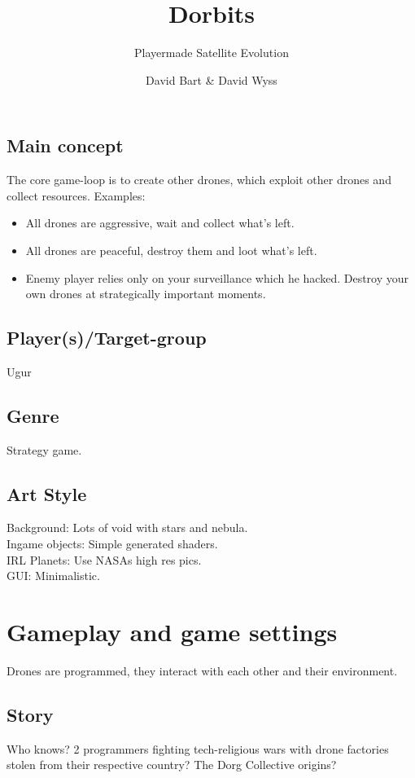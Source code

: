 \documentclass[a4paper]{scrreprt}
\title{Dorbits}
\subtitle{Playermade Satellite Evolution}
\author{David Bart & David Wyss}
\begin{document}
\maketitle

\tableofcontents

\section{Main concept}
The core game-loop is to create other drones, which exploit other drones and collect resources. 
Examples:
\begin{itemize}
	\item All drones are aggressive, wait and collect what's left.
	\item All drones are peaceful, destroy them and loot  what's left.
	\item Enemy player relies only on your surveillance which he hacked. Destroy your own drones at strategically important moments.
\end{itemize}

\section{Player(s)/Target-group}
Ugur

\section{Genre}
Strategy game.

\section{Art Style}
Background: Lots of void with stars and nebula.\\
Ingame objects: Simple generated shaders.\\
IRL Planets: Use NASAs high res pics.\\
GUI: Minimalistic.

\chapter{Gameplay and game settings}
Drones are programmed, they interact with each other and their environment.

\section{Story}
Who knows? 2 programmers fighting tech-religious wars with drone factories stolen from their respective country? The Dorg Collective origins?
\end{document}

